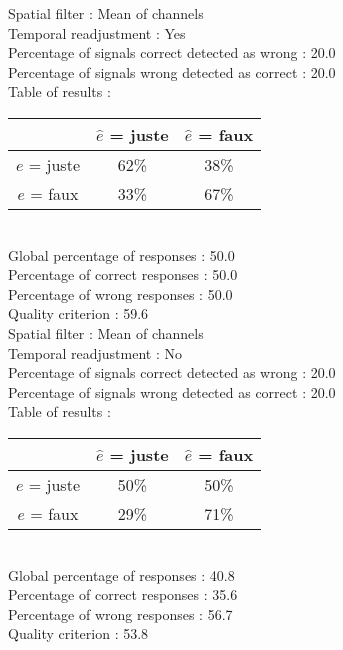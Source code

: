 Spatial filter : Mean of channels \\
Temporal readjustment : Yes \\
Percentage of signals correct detected as wrong :   20.0 \\
Percentage of signals wrong detected as correct :   20.0 \\
Table of results : \\
\begin{tabular}{|c|c|c|}
\hline				& $\hat{e}$ = juste & $\hat{e}$ = faux \\
\hline  $e$ = juste	&     62\%			&     38\%		\\
\hline  $e$ = faux	&     33\%			&     67\%		\\
\hline
\end{tabular}\\
Global percentage of responses :   50.0 \\
Percentage of correct responses :   50.0 \\
Percentage of wrong responses :   50.0 \\
Quality criterion :   59.6 \\

Spatial filter : Mean of channels \\
Temporal readjustment : No \\
Percentage of signals correct detected as wrong :   20.0 \\
Percentage of signals wrong detected as correct :   20.0 \\
Table of results : \\
\begin{tabular}{|c|c|c|}
\hline				& $\hat{e}$ = juste & $\hat{e}$ = faux \\
\hline  $e$ = juste	&     50\%			&     50\%		\\
\hline  $e$ = faux	&     29\%			&     71\%		\\
\hline
\end{tabular}\\
Global percentage of responses :   40.8 \\
Percentage of correct responses :   35.6 \\
Percentage of wrong responses :   56.7 \\
Quality criterion :   53.8 \\

